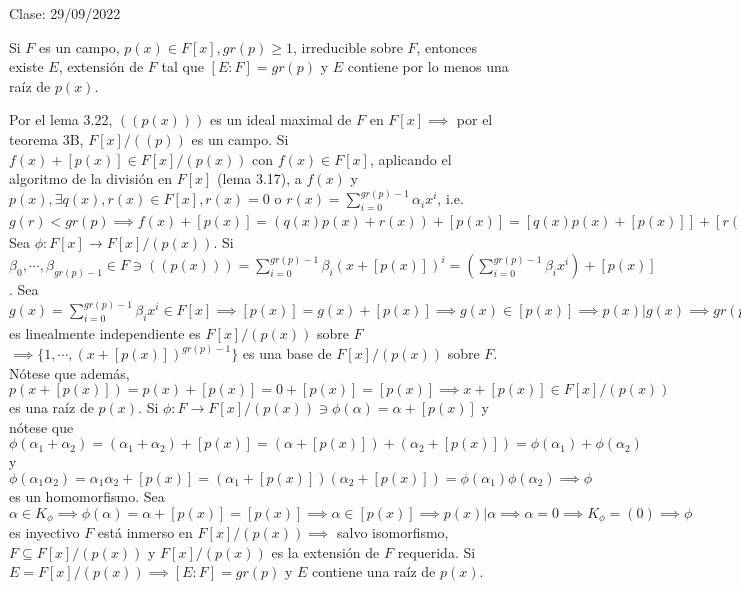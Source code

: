 Clase: 29/09/2022
\begin{teorema}[5G]
    Si $F$ es un campo, $p(x)\in F[x],gr(p)\geq 1$, irreducible sobre $F$, entonces existe $E$, extensión de $F$ tal que $[E:F]=gr(p)$ y $E$ contiene por lo menos una raíz de $p(x)$.
    \begin{dem}
        Por el lema 3.22, $((p(x)))$ es un ideal maximal de $F$ en $F[x]\implies$ por el teorema 3B, $F[x]/((p))$ es un campo. Si $f(x)+[p(x)]\in F[x]/(p(x))$ con $f(x)\in F[x]$, aplicando el algoritmo de la división en $F[x]$ (lema 3.17), a $f(x)$ y $p(x), \exists q(x),r(x)\in F[x],r(x)=0$ o $r(x)=\sum_{i=0}^{gr(p)-1}\alpha_i x^i$, i.e. $g(r)<gr(p)\implies f(x)+[p(x)]=(q(x)p(x)+r(x))+[p(x)]=[q(x)p(x)+[p(x)]]+[r(x)+[p(x)]]=[0+[p(x)]]+[r(x)+[p(x)]]=[p(x)]+[r(x)+[p(x)]]=r(x)+[p(x)]=\sum_{i=0}^{gr(p)-1}\alpha_i x^i+[p(x)]=\sum_{i=0}^{gr(p)-1}(\alpha_i + [p(x)])=\sum_{i=0}^{gr(p)-1}\alpha_i (x^i +[p(x)])=\sum_{i=0}^{gr(p)-1}\alpha_i (x+(p(x)))^i\implies F[x]/(p(x))=\langle\{1,\cdots, (x+[p(x)])^{gr(p)-1}\}\rangle_F$ Sea $\phi:F[x]\to F[x]/(p(x))$. Si $\beta_0,\cdots, \beta_{gr(p)-1}\in F\ni ((p(x)))=\sum_{i=0}^{gr(p)-1}\beta_i(x+[p(x)])^i = \left(\sum_{i=0}^{gr(p)-1}\beta_i x^i\right)+[p(x)]$. Sea $g(x)=\sum_{i=0}^{gr(p)-1}\beta_i x^i\in F[x]\implies [p(x)]=g(x)+[p(x)]\implies g(x)\in [p(x)]\implies p(x)|g(x)\implies gr(p)-1\geq gr(q)\geq gr(p)\implies p(x)=0\implies \beta_0=\cdots =\beta_{gr(p)-1}\implies \{1,\cdots,(x+[p(x)])^{gr(p)-1}\}$ es linealmente independiente es $F[x]/(p(x))$ sobre $F$ $\implies\{1,\cdots, (x+[p(x)])^{gr(p)-1}\}$ es una base de $F[x]/(p(x))$ sobre $F$. Nótese que además, $p(x+[p(x)])=p(x)+[p(x)]=0+[p(x)]=[p(x)]\implies x+[p(x)]\in F[x]/(p(x))$ es una raíz de $p(x)$. Si $\phi:F\to F[x]/(p(x))\ni \phi(\alpha)=\alpha+[p(x)]$ y nótese que $\phi(\alpha_1+\alpha_2)=(\alpha_1+\alpha_2)+[p(x)]=(\alpha +[p(x)])+(\alpha_2+[p(x)])=\phi(\alpha_1)+\phi(\alpha_2)$ y $\phi(\alpha_1\alpha_2)=\alpha_1\alpha_2 +[p(x)]=(\alpha_1+[p(x)])(\alpha_2+[p(x)])=\phi(\alpha_1)\phi(\alpha_2)\implies\phi$ es un homomorfismo. Sea $\alpha\in K_\phi\implies \phi(\alpha)=\alpha + [p(x)]=[p(x)]\implies \alpha\in [p(x)]\implies p(x)|\alpha \implies \alpha=0\implies K_\phi =(0)\implies \phi$ es inyectivo $F$ está inmerso en $F[x]/(p(x))\implies$ salvo isomorfismo, $F\subseteq F[x]/(p(x))$ y $F[x]/(p(x))$ es la extensión de $F$ requerida. Si $E=F[x]/(p(x))\implies [E:F]=gr(p)$ y $E$ contiene una raíz de $p(x)$. 
    \end{dem}
\end{teorema}